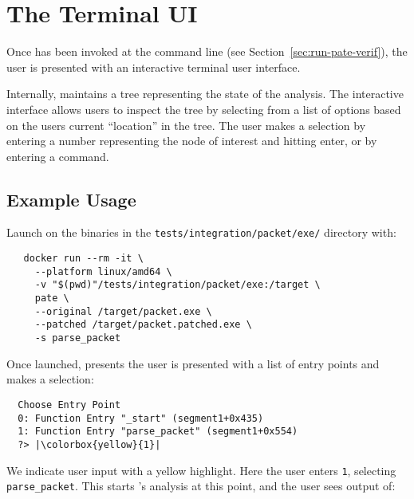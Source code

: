 \section{The \pate{} Terminal UI}
\label{sec:terminal-ui}

Once \pate{} has been invoked at the command line (see Section~\ref{sec:run-pate-verif}), the user is presented with an interactive terminal user interface.

Internally, \pate{} maintains a tree representing the state of the analysis.
The interactive interface allows users to inspect the tree by selecting from a list of options based on the users current ``location'' in the tree.
The user makes a selection by entering a number representing the node of interest and hitting enter, or by entering a command.

\subsection{Example Usage}

Launch \pate{} on the binaries in the \texttt{tests/integration/packet/exe/} directory with:

\begin{verbatim}
   docker run --rm -it \
     --platform linux/amd64 \
     -v "$(pwd)"/tests/integration/packet/exe:/target \
     pate \
     --original /target/packet.exe \
     --patched /target/packet.patched.exe \
     -s parse_packet
 \end{verbatim}

Once launched, \pate{} presents the user is presented with a list of entry points and makes a selection:
\begin{lstlisting}
  Choose Entry Point
  0: Function Entry "_start" (segment1+0x435)
  1: Function Entry "parse_packet" (segment1+0x554)
  ?> |\colorbox{yellow}{1}|
\end{lstlisting}

We indicate user input with a yellow highlight.
Here the user enters \texttt{1}, selecting \texttt{parse\_packet}.
This starts \pate{}'s analysis at this point, and the user sees output of:

